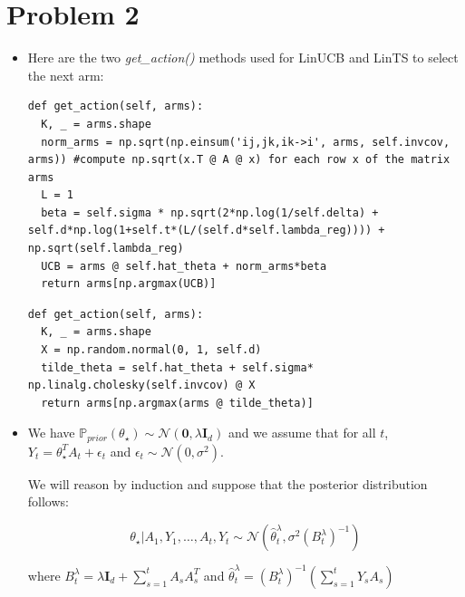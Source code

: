 \section{Problem 2}

\begin{itemize}
\item Here are the two \textit{get\_action()} methods used for LinUCB and LinTS to select the next arm:

\begin{verbatim}
def get_action(self, arms):
  K, _ = arms.shape
  norm_arms = np.sqrt(np.einsum('ij,jk,ik->i', arms, self.invcov, arms)) #compute np.sqrt(x.T @ A @ x) for each row x of the matrix arms
  L = 1
  beta = self.sigma * np.sqrt(2*np.log(1/self.delta) + self.d*np.log(1+self.t*(L/(self.d*self.lambda_reg)))) + np.sqrt(self.lambda_reg)
  UCB = arms @ self.hat_theta + norm_arms*beta
  return arms[np.argmax(UCB)]
\end{verbatim}
\begin{verbatim}
def get_action(self, arms):
  K, _ = arms.shape
  X = np.random.normal(0, 1, self.d)
  tilde_theta = self.hat_theta + self.sigma* np.linalg.cholesky(self.invcov) @ X
  return arms[np.argmax(arms @ tilde_theta)]
\end{verbatim}


\item We have $\mathbb{P}_{prior}(\theta_{\star}) \sim \mathcal{N}(\mathbf{0}, \lambda \mathbf{I}_d)$ and we assume that for all $t$, $Y_{t} = \theta_{\star}^TA_t + \epsilon_t$ and $\epsilon_t \sim \mathcal{N}(0, \sigma^2)$.

We will reason by induction and suppose that the posterior distribution follows:

\[
\theta_{\star}|A_1, Y_1, \dots, A_t, Y_t \sim \mathcal{N}(\hat\theta_t^{\lambda}, \sigma^2{(B_t^{\lambda})}^{-1})
\]

where $B_t^{\lambda} = \lambda \mathbf{I}_d + \sum_{s=1}^t A_s A_s^T$ and $\hat\theta_t^{\lambda} = {(B_t^{\lambda})}^{-1} (\sum_{s=1}^t Y_s A_s)$


\end{itemize}
